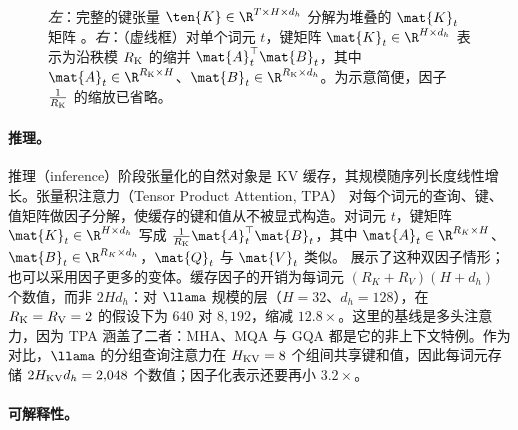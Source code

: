 \begin{figure}[!htbp]
{}
  \caption{\textit{左}：完整的键张量 $\ten{K}\in\R^{T\times H \times d_h}$ 分解为堆叠的 $\mat{K}_t$ 矩阵 \cite{zhang2026tpa}。\textit{右}：（虚线框）对单个词元 $t$，键矩阵 $\mat{K}_t\in\R^{H \times d_h}$ 表示为沿秩模 $R_{\rm K}$ 的缩并 $\mat{A}_t^\top\mat{B}_t$，其中 $\mat{A}_t\in\R^{R_{\rm K}\times H}$、$\mat{B}_t\in\R^{R_{\rm K}\times d_h}$。为示意简便，因子 $\frac{1}{R_{\rm K}}$ 的缩放已省略。}
\label{fig:example-inference}
\end{figure}

\paragraph{推理。} 推理（inference）阶段张量化的自然对象是 KV 缓存，其规模随序列长度线性增长。张量积注意力（Tensor Product Attention, TPA）\cite{zhang2026tpa} 对每个词元的查询、键、值矩阵做因子分解，使缓存的键和值从不被显式构造。对词元 $t$，键矩阵 $\mat{K}_t\in\R^{H\times d_h}$ 写成 $\frac{1}{R_{\rm K}}\mat{A}_t^\top\mat{B}_t$，其中 $\mat{A}_t\in\R^{R_K\times H}$、$\mat{B}_t\in\R^{R_K\times d_h}$，$\mat{Q}_t$ 与 $\mat{V}_t$ 类似。 展示了这种双因子情形；也可以采用因子更多的变体。缓存因子的开销为每词元 $(R_K+R_V)(H+d_h)$ 个数值，而非 $2Hd_h$：对 $\llama$ 规模的层（$H=32$、$d_h=128$），在 $R_{\rm K} = R_{\rm V} = 2$ 的假设下为 $640$ 对 $8{,}192$，缩减 $12.8\times$。这里的基线是多头注意力，因为 TPA 涵盖了二者：MHA、MQA 与 GQA 都是它的非上下文特例。作为对比，$\llama$ 的分组查询注意力在 $H_{\rm KV}=8$ 个组间共享键和值，因此每词元存储 $2H_{\rm KV}d_h=2{,}048$ 个数值；因子化表示还要再小 $3.2\times$。

\paragraph{可解释性。} 

